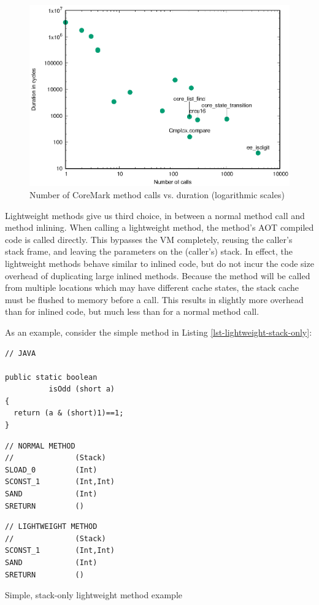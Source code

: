\begin{figure}
\centering
\includegraphics[width=.5\linewidth]{method-calls-vs-duration.eps}
\caption[Number of CoreMark method calls vs. duration]{Number of CoreMark method calls vs. duration (logarithmic scales)}
\label{fig-coremark-method-calls-vs-duration}
\end{figure}

Lightweight methods give us third choice, in between a normal method call and method inlining. When calling a lightweight method, the method's AOT compiled code is called directly. This bypasses the VM completely, reusing the caller's stack frame, and leaving the parameters on the (caller's) stack. In effect, the lightweight methods behave similar to inlined code, but do not incur the code size overhead of duplicating large inlined methods. Because the method will be called from multiple locations which may have different cache states, the stack cache must be flushed to memory before a call. This results in slightly more overhead than for inlined code, but much less than for a normal method call.

As an example, consider the simple  method in Listing \ref{lst-lightweight-stack-only}:

\begin{listing}
\centering
\begin{minipage}[t]{0.32\textwidth}
\centering
\begin{verbatim}
// JAVA

public static boolean
          isOdd (short a)
{
  return (a & (short)1)==1;
}
\end{verbatim}
\end{minipage}\hfill
\begin{minipage}[t]{0.29\textwidth}
\centering
\begin{verbatim}
// NORMAL METHOD
//              (Stack)
SLOAD_0         (Int)
SCONST_1        (Int,Int)
SAND            (Int)
SRETURN         ()
\end{verbatim}
\end{minipage}\hfill
\begin{minipage}[t]{0.29\textwidth}
\centering
\begin{verbatim}
// LIGHTWEIGHT METHOD
//              (Stack)
SCONST_1        (Int,Int)
SAND            (Int)
SRETURN         ()
\end{verbatim}
\end{minipage}
\caption{Simple, stack-only lightweight method example}
\label{lst-lightweight-stack-only}
\end{listing}


